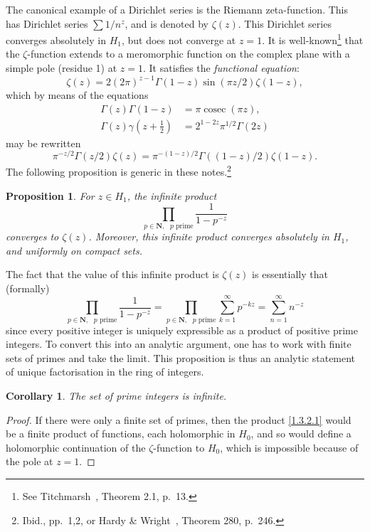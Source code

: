 \documentclass[10pt,leqno]{article}
\newtheorem{prop}[theo]{Proposition}
\newtheorem{coro}[theo]{Corollary}
\theoremstyle{definition}
\def\NN{\mathbf{N}}
\def\fnei{See Titchmarsh~\cite{bib:195}, Theorem 2.1, p.~13.}
\def\fnni{Ibid., pp.~1,2, or Hardy \& Wright~\cite{bib:86}, Theorem 280, p.~246.}
\begin{document}
The canonical example of a Dirichlet series is the Riemann zeta-function.
This has Dirichlet series $\sum 1/n^z$, and is denoted by $\zeta(z)$.
This Dirichlet series converges absolutely in $H_1$, but does not converge at $z = 1$.
It is well-known\footnote{\fnei} that the $\zeta$-function extends to a meromorphic function on the complex plane with a simple pole (residue 1) at $z = 1$.
It satisfies the \emph{functional equation}:
\begin{equation}
\label{1.3.1}
\zeta(z) = 2 (2\pi)^{z-1} \Gamma(1-z) \sin(\pi z/2) \zeta(1-z),
\end{equation}
which by means of the equations
\begin{align*}
\Gamma(z) \Gamma(1-z)
&= \pi \operatorname{cosec} (\pi z),
\\
\Gamma(z) \gamma(z + \tfrac 12) 
&= 2^{1-2z} \pi^{1/2} \Gamma(2z)
\end{align*}
may be rewritten
\[
\pi^{-z/2} \Gamma(z/2) \zeta(z)
= \pi^{-(1-z)/2} \Gamma((1-z)/2) \zeta(1-z).
\]
The following proposition is generic in these notes.\footnote{\fnni}


\begin{prop}
\label{1.3.2}
For $z \in H_1$, the infinite product
\begin{equation}
\label{1.3.2.1}
\prod_{p \in \NN,\text{ $p$ prime}}
\frac{1}{1-p^{-z}}
\end{equation}
converges to $\zeta(z)$.
Moreover, this infinite product converges absolutely in $H_1$, and uniformly on compact sets.
\end{prop}

The fact that the value of this infinite product is $\zeta(z)$ is essentially that (formally)
\[
\prod_{p \in \NN,\text{ $p$ prime}}
\frac{1}{1-p^{-z}}
= \prod_{p \in \NN,\text{ $p$ prime}}
\sum_{k=1}^\infty p^{-kz}
= \sum_{n=1}^\infty n^{-z}
\]
since every positive integer is uniquely expressible as a product of positive prime integers.
To convert this into an analytic argument, one has to work with finite sets of primes and take the limit.
This proposition is thus an analytic statement of unique factorisation in the ring of integers.


\begin{coro}
\label{1.3.3}
The set of prime integers is infinite.
\end{coro}

\begin{proof}
If there were only a finite set of primes, then the product \eqref{1.3.2.1} would be a finite product of functions, each holomorphic in $H_0$, and so would define a holomorphic continuation of the $\zeta$-function to $H_0$, which is impossible because of the pole at $z = 1$.
\end{proof}
\end{document}
